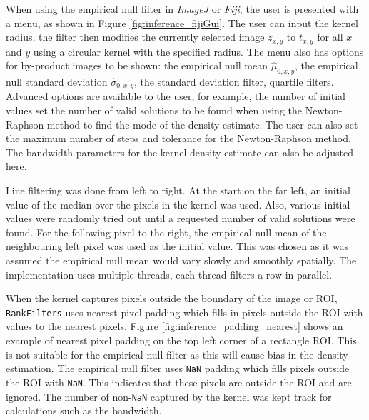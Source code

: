 When using the empirical null filter in \emph{ImageJ} or \emph{Fiji}, the user is presented with a menu, as shown in Figure \ref{fig:inference_fijiGui}. The user can input the kernel radius, the filter then modifies the currently selected image $z_{x,y}$ to $t_{x,y}$ for all $x$ and $y$ using a circular kernel with the specified radius. The menu also has options for by-product images to be shown: the empirical null mean $\widehat{\mu}_{0,x,y}$, the empirical null standard deviation $\widehat{\sigma}_{0,x,y}$, the standard deviation filter, quartile filters. Advanced options are available to the user, for example, the number of initial values set the number of valid solutions to be found when using the Newton-Raphson method to find the mode of the density estimate. The user can also set the maximum number of steps and tolerance for the Newton-Raphson method. The bandwidth parameters for the kernel density estimate can also be adjusted here.

Line filtering was done from left to right. At the start on the far left, an initial value of the median over the pixels in the kernel was used. Also, various initial values were randomly tried out until a requested number of valid solutions were found. For the following pixel to the right, the empirical null mean of the neighbouring left pixel was used as the initial value. This was chosen as it was assumed the empirical null mean would vary slowly and smoothly spatially. The implementation uses multiple threads, each thread filters a row in parallel.

When the kernel captures pixels outside the boundary of the image or ROI, \texttt{RankFilters} uses nearest pixel padding which fills in pixels outside the ROI with values to the nearest pixels. Figure \ref{fig:inference_padding_nearest} shows an example of nearest pixel padding on the top left corner of a rectangle ROI. This is not suitable for the empirical null filter as this will cause bias in the density estimation. The empirical null filter uses \texttt{NaN} padding which fills pixels outside the ROI with \texttt{NaN}. This indicates that these pixels are outside the ROI and are ignored. The number of non-\texttt{NaN} captured by the kernel was kept track for calculations such as the bandwidth.

